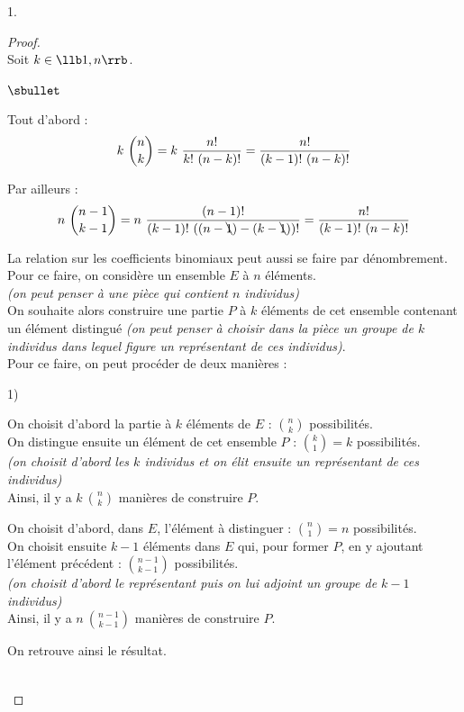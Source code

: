 \documentclass[11pt]{article}%
\begin{document}
\begin{noliste}{1.}
  \begin{proof}~\\%
    Soit $k \in \llb 1, n \rrb$.
    \begin{noliste}{$\sbullet$}
    \item Tout d'abord :
      \[
      k \ \dbinom{n}{k} = k \ \dfrac{n!}{k! \ (n-k)!} =
      \dfrac{n!}{(k-1)! \ (n-k)!}
      \]
    \item Par ailleurs :
      \[
      n \ \dbinom{n-1}{k-1} = n \ \dfrac{(n-1)!}{(k-1)! \
        ((n-\bcancel{1})-(k-\bcancel{1}))!} = \dfrac{n!}{(k-1)! \
        (n-k)!}
      \]
    \end{noliste}
    \begin{remark}
      La relation sur les coefficients binomiaux peut aussi se
      faire par dénombrement.\\
      Pour ce faire, on considère un ensemble $E$ à $n$ éléments.\\
      {\it (on peut penser à une pièce qui contient $n$
        individus)}\\
      On souhaite alors construire une partie $P$ à $k$ éléments de
      cet ensemble contenant un élément distingué {\it (on peut
        penser à choisir dans la pièce un groupe de $k$ individus
        dans lequel figure un représentant de ces individus)}.\\
      Pour ce faire, on peut procéder de deux manières :
      \begin{noliste}{1)}
      \item On choisit d'abord la partie à $k$ éléments de $E$ :
        $\binom{n}{k}$ possibilités.\\[.1cm]
        On distingue ensuite un élément de cet ensemble $P$ :
        $\binom{k}{1} = k$ possibilités.\\
        {\it (on choisit d'abord les $k$ individus et on élit
          ensuite un représentant de ces individus)}\\[.1cm]
        Ainsi, il y a $k \ \binom{n}{k}$ manières de construire $P$.
        
      \item On choisit d'abord, dans $E$, l'élément à distinguer :
        $\binom{n}{1} = n$ possibilités.\\[.1cm]
        On choisit ensuite $k-1$ éléments dans $E$ qui, pour former
        $P$, en y ajoutant l'élément précédent : $\binom{n-1}{k-1}$
        possibilités.\\
        {\it (on choisit d'abord le représentant puis on lui adjoint
          un groupe de $k-1$ individus)}\\[.1cm]
        Ainsi, il y a $n \ \binom{n-1}{k-1}$ manières de construire
        $P$.
      \end{noliste}
      On retrouve ainsi le résultat.
    \end{remark}~\\[-1.4cm]
  \end{proof}


\end{noliste}
\end{document}
